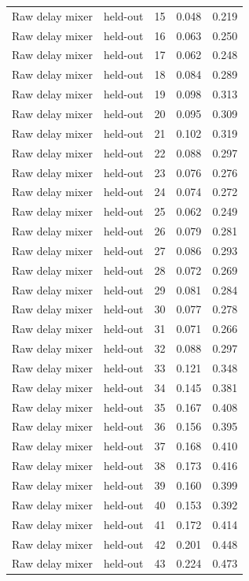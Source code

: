 \begin{tabular}{llrrr}
Raw delay mixer & held-out & 15 & 0.048 & 0.219 \\
Raw delay mixer & held-out & 16 & 0.063 & 0.250 \\
Raw delay mixer & held-out & 17 & 0.062 & 0.248 \\
Raw delay mixer & held-out & 18 & 0.084 & 0.289 \\
Raw delay mixer & held-out & 19 & 0.098 & 0.313 \\
Raw delay mixer & held-out & 20 & 0.095 & 0.309 \\
Raw delay mixer & held-out & 21 & 0.102 & 0.319 \\
Raw delay mixer & held-out & 22 & 0.088 & 0.297 \\
Raw delay mixer & held-out & 23 & 0.076 & 0.276 \\
Raw delay mixer & held-out & 24 & 0.074 & 0.272 \\
Raw delay mixer & held-out & 25 & 0.062 & 0.249 \\
Raw delay mixer & held-out & 26 & 0.079 & 0.281 \\
Raw delay mixer & held-out & 27 & 0.086 & 0.293 \\
Raw delay mixer & held-out & 28 & 0.072 & 0.269 \\
Raw delay mixer & held-out & 29 & 0.081 & 0.284 \\
Raw delay mixer & held-out & 30 & 0.077 & 0.278 \\
Raw delay mixer & held-out & 31 & 0.071 & 0.266 \\
Raw delay mixer & held-out & 32 & 0.088 & 0.297 \\
Raw delay mixer & held-out & 33 & 0.121 & 0.348 \\
Raw delay mixer & held-out & 34 & 0.145 & 0.381 \\
Raw delay mixer & held-out & 35 & 0.167 & 0.408 \\
Raw delay mixer & held-out & 36 & 0.156 & 0.395 \\
Raw delay mixer & held-out & 37 & 0.168 & 0.410 \\
Raw delay mixer & held-out & 38 & 0.173 & 0.416 \\
Raw delay mixer & held-out & 39 & 0.160 & 0.399 \\
Raw delay mixer & held-out & 40 & 0.153 & 0.392 \\
Raw delay mixer & held-out & 41 & 0.172 & 0.414 \\
Raw delay mixer & held-out & 42 & 0.201 & 0.448 \\
Raw delay mixer & held-out & 43 & 0.224 & 0.473 \\

\end{tabular}
